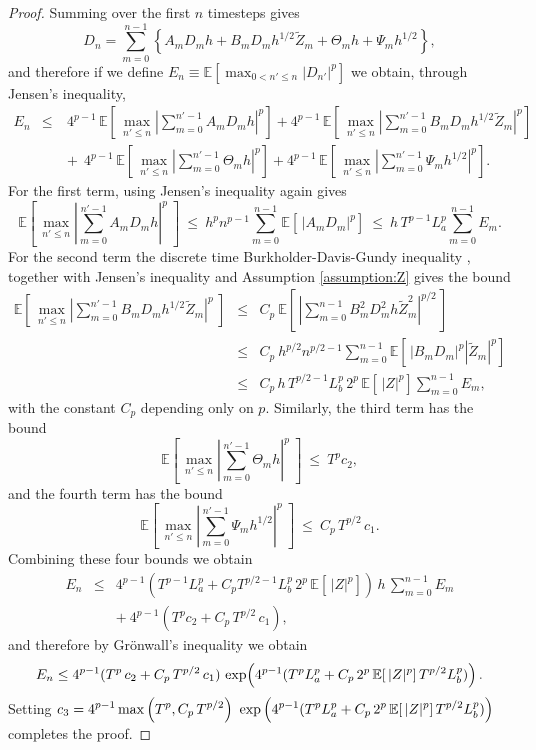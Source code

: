 \documentclass[review]{siamart190516}
\def \EE {{\mathbb{E}}}
\def \tZ {{\widetilde{Z}}}
\begin{document}
\begin{proof}
Summing over the first $n$ timesteps gives
\[
D_n = \sum_{m=0}^{n-1} 
\left\{  A_m D_m h + B_m D_m h^{1/2} \tZ_m + \Theta_m h + \Psi_m h^{1/2}\right\},
\]
and therefore if we define 
$\displaystyle E_n \equiv \EE\left[\max_{0< n'\leq n}|D_{n'}|^p \right]$ we obtain,
through Jensen's inequality,
\begin{eqnarray*}
E_n &\leq& 
~ 4^{p-1}\, \EE\left[ \,\max_{n'\leq n} \left| \sum_{m=0}^{n'-1}  A_m D_m h \right|^p\right]
+ 4^{p-1}\, \EE\left[ \,\max_{n'\leq n} \left| \sum_{m=0}^{n'-1}  B_m D_m h^{1/2} \tZ_m \right|^p\right]
\\ && \!\!\!\!
+\ 4^{p-1}\, \EE\left[ \,\max_{n'\leq n}  \left| \sum_{m=0}^{n'-1}  \Theta_m h \right|^p\right]
+ 4^{p-1}\, \EE\left[ \,\max_{n'\leq n} \left| \sum_{m=0}^{n'-1}  \Psi_m h^{1/2} \right|^p\right].
\end{eqnarray*}
For the first term, using Jensen's inequality again gives
\[
\EE\left[ \, \max_{n'\leq n} \left| \sum_{m=0}^{n'-1}  A_m D_m h \right|^p\ \right]
\ \leq\ h^p n^{p-1} \sum_{m=0}^{n-1} \EE\left[ \,| A_m D_m |^p \right]
\ \leq\  h\, T^{p-1} L_a^p \sum_{m=0}^{n-1} E_m.
\]
For the second term the discrete time Burkholder-Davis-Gundy 
inequality \cite{bdg72}, together with Jensen's inequality and
Assumption \ref{assumption:Z} gives the bound
\begin{eqnarray*}
\EE\left[ \, \max_{n'\leq n} \left| \sum_{m=0}^{n'-1}  B_m D_m h^{1/2} \tZ_m \right|^p\ \right]
&\leq& C_p\ \EE\left[ \,\left| \sum_{m=0}^{n-1} B^2_m D^2_m h \tZ_m^2 \right|^{p/2}\, \right]
\\
&\leq& C_p\ h^{p/2} n^{p/2-1} \sum_{m=0}^{n-1} \EE\left[ \,| B_m D_m|^p |\tZ_m|^p  \right]
\\
&\leq& C_p\, h\, T^{p/2-1} L_b^p\, 2^p\, \EE[\,|Z|^p] \sum_{m=0}^{n-1} E_m,
\end{eqnarray*}
with the constant $C_p$ depending only on $p$.
Similarly, the third term has the bound
\[
\EE\left[ \, \max_{n'\leq n} \left| \sum_{m=0}^{n'-1}  \Theta_m h \right|^p\ \right]
\ \leq\  T^p c_2,
\]
and the fourth term has the bound
\[
\EE\left[ \, \max_{n'\leq n} \left| \sum_{m=0}^{n'-1}  \Psi_m h^{1/2} \right|^p\ \right]
\ \leq\ C_p\,  T^{p/2}  \, c_1.
\]
Combining these four bounds we obtain
\begin{eqnarray*}
E_n &\leq& 4^{p-1} \left(T^{p-1} L_a^p  + C_p T^{p/2-1} L_b^p\, 2^p\, \EE[\,|Z|^p] \right)
\, h\, \sum_{m=0}^{n-1} E_m
\\ && +\ 4^{p-1} \left( T^p c_2 + C_p\, T^{p/2}\, c_1\right),
\end{eqnarray*}
and therefore by Gr\"onwall's inequality we obtain
\[
E_n \leq  4^{p-1} ( T^p\, c_2 + C_p\,  T^{p/2}\, c_1)\,
\exp\!\left(\rule{0in}{0.14in}4^{p-1} (T^p L_a^p  + C_p\, 2^p\, \EE[\,|Z|^p] \, T^{p/2} L_b^p)\right).
\]
Setting
$\displaystyle
c_3 = 4^{p-1} \max\left( T^p, C_p\, T^{p/2}\right) \ 
\exp\left(\rule{0in}{0.16in}4^{p-1} (T^p L_a^p  + C_p\, 2^p\, \EE[\,|Z|^p] \, T^{p/2} L_b^p)\right)
$
completes the proof.
\end{proof}
\end{document}
